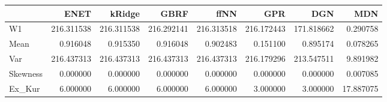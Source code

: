 \begin{tabular}{lrrrrrrr}
\toprule
{} &        ENET &      kRidge &        GBRF &        ffNN &         GPR &         DGN &        MDN \\
\midrule
W1       &  216.311538 &  216.311538 &  216.292141 &  216.313518 &  216.172443 &  171.818662 &   0.290758 \\
Mean     &    0.916048 &    0.915350 &    0.916048 &    0.902483 &    0.151100 &    0.895174 &   0.078265 \\
Var      &  216.437313 &  216.437313 &  216.437313 &  216.437313 &  216.179296 &  213.547511 &   9.891982 \\
Skewness &    0.000000 &    0.000000 &    0.000000 &    0.000000 &    0.000000 &    0.000000 &   0.007085 \\
Ex\_Kur   &    6.000000 &    6.000000 &    6.000000 &    6.000000 &    3.000000 &    3.000000 &  17.887075 \\
\bottomrule
\end{tabular}
